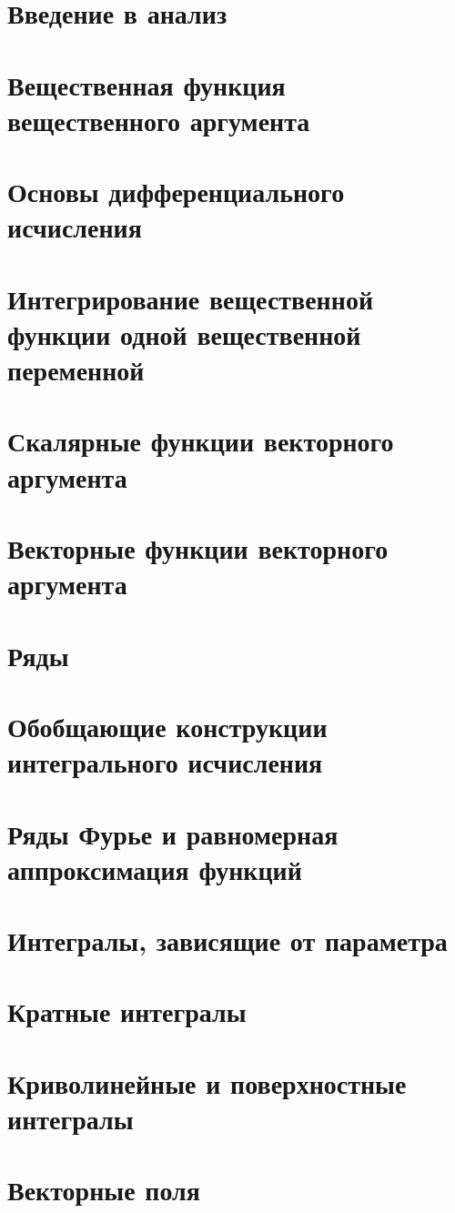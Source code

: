 
\LARGE


\tableofcontents %
\LARGE

\chapter{Введение в анализ}

\chapter{Вещественная функция вещественного аргумента}

\chapter{Основы дифференциального исчисления}

\chapter{Интегрирование вещественной функции одной вещественной переменной}

\chapter{Скалярные функции векторного аргумента}

\chapter{Векторные функции векторного аргумента}

\chapter{Ряды}

\chapter{Обобщающие конструкции интегрального исчисления}

\chapter{Ряды Фурье и равномерная аппроксимация функций}

\chapter{Интегралы, зависящие от параметра}

\chapter{Кратные интегралы}

\chapter{Криволинейные и поверхностные интегралы}

\chapter{Векторные поля}


